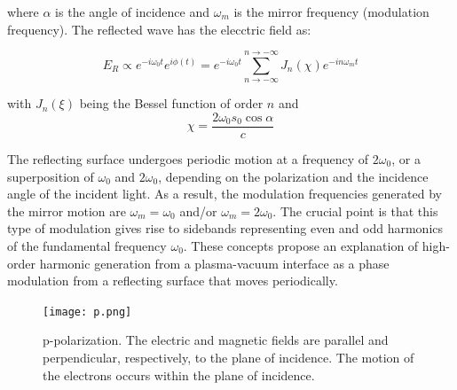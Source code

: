where $\alpha$ is the angle of incidence and $\omega_m$ is the mirror frequency (modulation frequency). The reflected wave has the elecctric field as:

\begin{equation}
    E_R \propto e^{-i\omega_0 t}e^{i\phi(t)} =  e^{-i\omega_0 t} \sum _{n \to -\infty}^{n \to -\infty}J_n(\chi) e^{-in\omega_m t}
\end{equation}

with $J_n(\xi)$ being the Bessel function of order $n$ and
\begin{equation}
    \label{eq:chi-def}
    \chi = \frac{2\omega_0s_0\cos\alpha}{c}
\end{equation}



The reflecting surface undergoes periodic motion at a frequency of $2\omega_0$, or a superposition of $\omega_0$ and $2\omega_0$, depending on the polarization and the incidence angle of the incident light. As a result, the modulation frequencies generated by the mirror motion are $\omega_m = \omega_0$ and/or $\omega_m = 2\omega_0$. The crucial point is that this type of modulation gives rise to sidebands representing even and odd harmonics of the fundamental frequency $\omega_0$. These concepts propose an explanation of high-order harmonic generation from a plasma-vacuum interface as a phase modulation from a reflecting surface that moves periodically.

\label{section:selection}
\begin{figure}[h]
    \centering
    \texttt{[image: p.png]}
    \caption{p-polarization. The electric and magnetic fields are parallel and perpendicular, respectively, to the plane of incidence. The motion of the electrons occurs within the plane of incidence.}
    \label{fig:p-polarized}
\end{figure}

